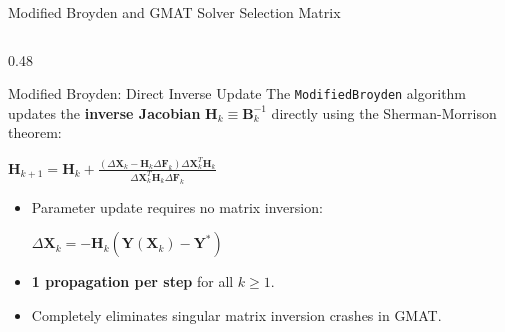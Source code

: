 \documentclass[aspectratio=169, 10pt]{beamer}
\begin{document}
\begin{frame}{Modified Broyden and GMAT Solver Selection Matrix}
    \begin{columns}[t]
        \begin{column}{0.48\textwidth}
            \begin{block}{Modified Broyden: Direct Inverse Update}
                \scriptsize
                The \texttt{ModifiedBroyden} algorithm updates the \textbf{inverse Jacobian} $\mathbf{H}_k \equiv \mathbf{B}_k^{-1}$ directly using the Sherman-Morrison theorem:
                \par\vspace{1pt}
                {\centering $\displaystyle \mathbf{H}_{k+1} = \mathbf{H}_k + \frac{\left(\Delta \mathbf{X}_k - \mathbf{H}_k \Delta \mathbf{F}_k\right) \Delta \mathbf{X}_k^T \mathbf{H}_k}{\Delta \mathbf{X}_k^T \mathbf{H}_k \Delta \mathbf{F}_k}$\par}
                \vspace{2pt}
                \begin{itemize}\setlength{\itemsep}{1.2pt}\setlength{\topsep}{0pt}
                    \item Parameter update requires no matrix inversion:
                    \par\vspace{1pt}
                    {\centering $\displaystyle \Delta \mathbf{X}_k = -\mathbf{H}_k \left(\mathbf{Y}(\mathbf{X}_k) - \mathbf{Y}^*\right)$\par}
                    \item \textbf{1 propagation per step} for all $k \ge 1$.
                    \item Completely eliminates singular matrix inversion crashes in GMAT.
                \end{itemize}
            \end{block}
        \end{column}


\end{columns}
\end{frame}
\end{document}
